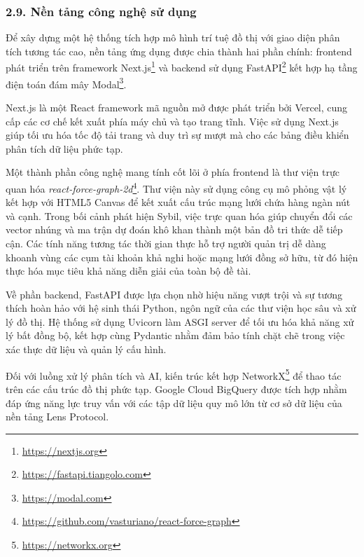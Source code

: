 \subsubsection{2.9. Nền tảng công nghệ sử dụng}

\indent\indent Để xây dựng một hệ thống tích hợp mô hình trí tuệ đồ thị với giao diện phân tích tương tác cao, nền tảng ứng dụng được chia thành hai phần chính: frontend phát triển trên framework Next.js\footnote{\url{https://nextjs.org}} và backend sử dụng FastAPI\footnote{\url{https://fastapi.tiangolo.com}} kết hợp hạ tầng điện toán đám mây Modal\footnote{\url{https://modal.com}}.\vspace{0.3cm}

Next.js là một React framework mã nguồn mở được phát triển bởi Vercel, cung cấp các cơ chế kết xuất phía máy chủ và tạo trang tĩnh. Việc sử dụng Next.js giúp tối ưu hóa tốc độ tải trang và duy trì sự mượt mà cho các bảng điều khiển phân tích dữ liệu phức tạp.\vspace{0.3cm}

Một thành phần công nghệ mang tính cốt lõi ở phía frontend là thư viện trực quan hóa \textit{react-force-graph-2d}\footnote{\url{https://github.com/vasturiano/react-force-graph}}. Thư viện này sử dụng công cụ mô phỏng vật lý kết hợp với HTML5 Canvas để kết xuất cấu trúc mạng lưới chứa hàng ngàn nút và cạnh. Trong bối cảnh phát hiện Sybil, việc trực quan hóa giúp chuyển đổi các vector nhúng và ma trận dự đoán khô khan thành một bản đồ tri thức dễ tiếp cận. Các tính năng tương tác thời gian thực hỗ trợ người quản trị dễ dàng khoanh vùng các cụm tài khoản khả nghi hoặc mạng lưới đồng sở hữu, từ đó hiện thực hóa mục tiêu khả năng diễn giải của toàn bộ đề tài.\vspace{0.3cm}

Về phần backend, FastAPI được lựa chọn nhờ hiệu năng vượt trội và sự tương thích hoàn hảo với hệ sinh thái Python, ngôn ngữ của các thư viện học sâu và xử lý đồ thị. Hệ thống sử dụng Uvicorn làm ASGI server để tối ưu hóa khả năng xử lý bất đồng bộ, kết hợp cùng Pydantic nhằm đảm bảo tính chặt chẽ trong việc xác thực dữ liệu và quản lý cấu hình.\vspace{0.3cm}

Đối với luồng xử lý phân tích và AI, kiến trúc kết hợp NetworkX\footnote{\url{https://networkx.org}} để thao tác trên các cấu trúc đồ thị phức tạp. Google Cloud BigQuery được tích hợp nhằm đáp ứng năng lực truy vấn với các tập dữ liệu quy mô lớn từ cơ sở dữ liệu của nền tảng Lens Protocol.\vspace{0.3cm}

